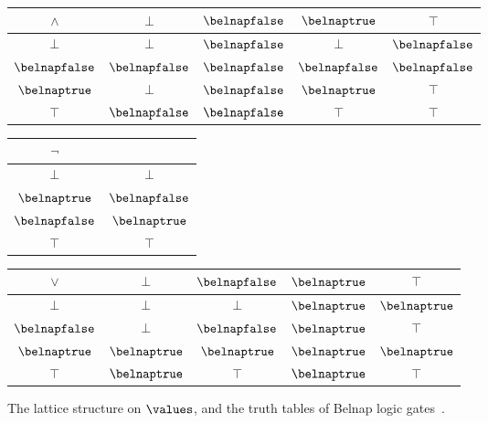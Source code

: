 \documentclass[10pt]{article}
\begin{document}
\begin{figure*}[p]
    \centering
    \qquad
    \begin{tabular}{|c|cccc|}
        \hline
        \(\land\)        & \(\bot\)         & \(\belnapfalse\) & \(\belnaptrue\)  & \(\top\)         \\
        \hline
        \(\bot\)         & \(\bot\)         & \(\belnapfalse\) & \(\bot\)         & \(\belnapfalse\) \\
        \(\belnapfalse\) & \(\belnapfalse\) & \(\belnapfalse\) & \(\belnapfalse\) & \(\belnapfalse\) \\
        \(\belnaptrue\)  & \(\bot\)         & \(\belnapfalse\) & \(\belnaptrue\)  & \(\top\)         \\
        \(\top\)         & \(\belnapfalse\) & \(\belnapfalse\) & \(\top\)         & \(\top\)         \\
        \hline
    \end{tabular}
    \quad
    \begin{tabular}{|c|c|}
        \hline
        \(\neg\)         &                  \\
        \hline
        \(\bot\)         & \(\bot\)         \\
        \(\belnaptrue\)  & \(\belnapfalse\) \\
        \(\belnapfalse\) & \(\belnaptrue\)  \\
        \(\top\)         & \(\top\)         \\
        \hline
    \end{tabular}
    \quad
    \begin{tabular}{|c|cccc|}
        \hline
        \(\lor\)         & \(\bot\)        & \(\belnapfalse\) & \(\belnaptrue\) & \(\top\)        \\
        \hline
        \(\bot\)         & \(\bot\)        & \(\bot\)         & \(\belnaptrue\) & \(\belnaptrue\) \\
        \(\belnapfalse\) & \(\bot\)        & \(\belnapfalse\) & \(\belnaptrue\) & \(\top\)        \\
        \(\belnaptrue\)  & \(\belnaptrue\) & \(\belnaptrue\)  & \(\belnaptrue\) & \(\belnaptrue\) \\
        \(\top\)         & \(\belnaptrue\) & \(\top\)         & \(\belnaptrue\) & \(\top\)        \\
        \hline
    \end{tabular}

    \caption{The lattice structure on \(\values\), and the truth tables
        of Belnap logic gates~\cite{belnap1977useful}.}
    \label{fig:belnap}
\end{figure*}
\end{document}

